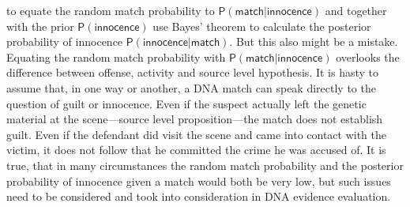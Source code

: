 \documentclass[
  10pt,
  dvipsnames,enabledeprecatedfontcommands]{scrartcl}
\newcommand{\pr}[1]{\mathsf{P}(#1)}
\begin{document}
to equate the random match probability to
\(\pr{\textsf{match} \vert \textsf{innocence}}\) and together with the
prior \(\pr{\textsf{innocence}}\) use Bayes' theorem to calculate the
posterior probability of innocence
\(\pr{\textsf{innocence} \vert \textsf{match}}\). But this also might be
a mistake. Equating the random match probability with
\(\pr{\textsf{match} \vert \textsf{innocence}}\) overlooks the
difference between offense, activity and source level hypothesis. It is
hasty to assume that, in one way or another, a DNA match can speak
directly to the question of guilt or innocence. Even if the suspect
actually left the genetic material at the scene---source level
proposition---the match does not establish guilt. Even if the defendant
did visit the scene and came into contact with the victim, it does not
follow that he committed the crime he was accused of. It is true, that
in many circumstances the random match probability and the posterior
probability of innocence given a match would both be very low, but such
issues need to be considered and took into consideration in DNA evidence
evaluation.
\end{document}
